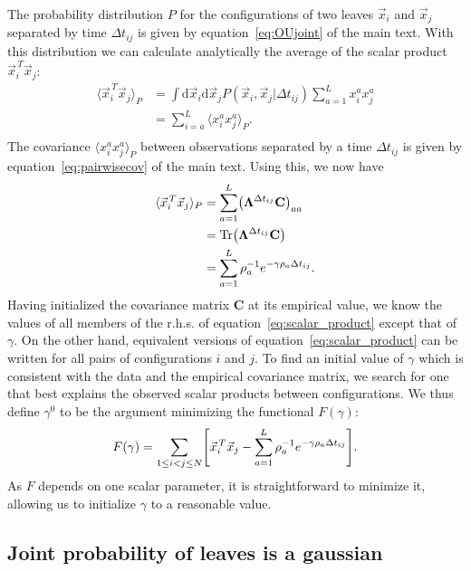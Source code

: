 \documentclass[preprint,amsmath,amssymb,superscriptaddress,showpacs,pre]{revtex4-1}
\let\originalleft\left
\let\originalright\right
\renewcommand{\left}{\mathopen{}\mathclose\bgroup\originalleft}
\renewcommand{\right}{\aftergroup\egroup\originalright}
\def\vx{\vec x}
\DeclareMathOperator{\Tr}{Tr}
\newcommand{\ddroit}{\textrm{d}}
\newcommand{\Lam}{\bm{\Lambda}}
\begin{document}
	The probability distribution $P$ for the configurations of two leaves $\vx_i$ and  $\vx_j$  separated by time $\Delta t_{ij}$ is given by equation~\ref{eq:OUjoint} of the main text. 
	With this distribution we can calculate analytically the average of the scalar product $\vx_i^{\,T}\vx_j$:
	\begin{align*}
		\langle \vx_i^{\,T}\vx_j \rangle_P &= \int \ddroit \vx_i \ddroit \vx_j P(\vx_i,\vx_j|\Delta t_{ij}) \sum_{a=1}^L   x_i^{a}x_j^{a}  \\
		&=\sum_{i=a}^L \langle  x_i^{a} x_j^a \rangle_{P}.\\
	\end{align*}
	The covariance $\langle  x_i^{a} x_j^a \rangle_{P}$ between observations separated by a time $\Delta t_{ij}$ is given by equation~\ref{eq:pairwisecov} of the main text.
	Using this, we now have
	\begin{align}
		\nonumber\langle \vx_i^{\,T}\vx_j \rangle_P &= \sum_{a=1}^L \left( \Lam^{\Delta t_{ij}} \mathbf{C} \right)_{aa}\\
		\nonumber&= \Tr\left( \Lam^{\Delta t_{ij}} \mathbf{C} \right)\\
		&= \sum_{a=1}^L \rho_a^{-1}e^{-\gamma\rho_a\Delta t_{ij}}.
		\label{eq:scalar_product}
	\end{align}
	Having initialized the covariance matrix $\mathbf{C}$ at its empirical value, we know the values of all members of the r.h.s. of equation~\ref{eq:scalar_product} except that of $\gamma$. 
	On the other hand, equivalent versions of equation~\ref{eq:scalar_product} can be written for all pairs of configurations $i$ and $j$. 
	To find an initial value of $\gamma$ which is consistent with the data and the empirical covariance matrix, we search for one that best explains the observed scalar products between configurations. 
	We thus define $\gamma^0$ to be the argument minimizing the functional $F(\gamma)$: 
	\begin{equation}
	 	F(\gamma) = \sum_{1\leq i<j\leq N}\left[ \vx_i^{\,T}\vx_j - \sum_{a=1}^L \rho_a^{-1}e^{-\gamma\rho_a\Delta t_{ij}} \right].
	\end{equation} 
	As $F$ depends on one scalar parameter, it is straightforward to minimize it, allowing us to initialize $\gamma$ to a reasonable value.


\subsection{Joint probability of leaves is a gaussian} %
\label{sec:joint_probability_of_leaves_is_a_gaussian}
\end{document}
